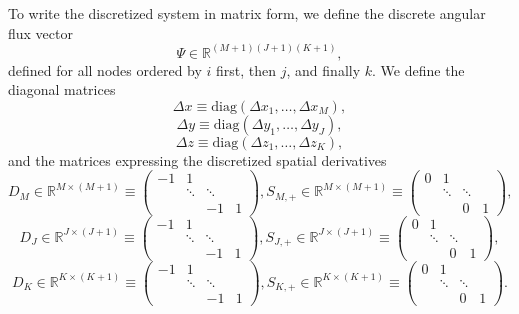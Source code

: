 To write the discretized system in matrix form, we define the discrete angular flux vector
\begin{equation}
\Psi \in \mathbb{R}^{(M+1)(J+1)(K+1)},
\end{equation}
defined for all nodes ordered by $i$ first, then $j$, and finally $k$. We define the diagonal matrices
\begin{equation}
	\Delta x \equiv \text{diag}(\Delta x_{1}, \dots, \Delta x_{M}),
\end{equation}
\begin{equation}
	\Delta y \equiv \text{diag}(\Delta y_{1}, \dots, \Delta y_{J}),
\end{equation}
\begin{equation}
	\Delta z \equiv \text{diag}(\Delta z_{1}, \dots, \Delta z_{K}),
\end{equation}
and the matrices expressing the discretized spatial derivatives 
\begin{equation}
	D_{M} \in \mathbb{R}^{M \times (M+1)} \equiv \begin{pmatrix}
				-1 & 1 & &  \\
				& \ddots & \ddots  & \\
				& & -1 & 1
		             \end{pmatrix},
	S_{M,+} \in \mathbb{R}^{M \times (M+1)} \equiv \begin{pmatrix}
				0 & 1 & &  \\
				& \ddots & \ddots  & \\
				& & 0 & 1
				\end{pmatrix},
\end{equation}
\begin{equation}
	D_{J} \in \mathbb{R}^{J \times (J+1)} \equiv \begin{pmatrix}
				-1 & 1 & &  \\
				& \ddots & \ddots  & \\
				& & -1 & 1
		             \end{pmatrix},
	S_{J,+} \in \mathbb{R}^{J \times (J+1)} \equiv \begin{pmatrix}
				0 & 1 & &  \\
				& \ddots & \ddots  & \\
				& & 0 & 1
				\end{pmatrix},
\end{equation}
\begin{equation}
	D_{K} \in \mathbb{R}^{K \times (K+1)} \equiv \begin{pmatrix}
				-1 & 1 & &  \\
				& \ddots & \ddots  & \\
				& & -1 & 1
		             \end{pmatrix},
	S_{K,+} \in \mathbb{R}^{K \times (K+1)} \equiv \begin{pmatrix}
				0 & 1 & &  \\
				& \ddots & \ddots  & \\
				& & 0 & 1
				\end{pmatrix}.
\end{equation}
